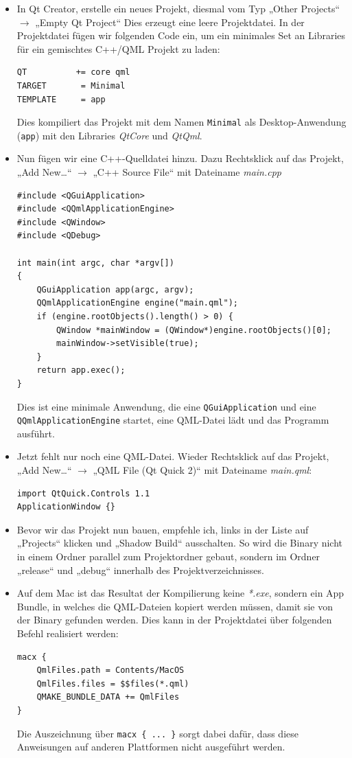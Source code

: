 \documentclass[a4paper]{article}
\begin{document}
\begin{itemize}
\item In Qt Creator, erstelle ein neues Projekt, diesmal vom Typ „Other Projects“ $\rightarrow$ „Empty Qt Project“
Dies erzeugt eine leere Projektdatei. In der Projektdatei fügen wir folgenden Code ein, um ein minimales Set an Libraries für ein gemischtes C++/QML Projekt zu laden:

\begin{verbatim}
QT          += core qml
TARGET       = Minimal
TEMPLATE     = app
\end{verbatim}

Dies kompiliert das Projekt mit dem Namen \verb~Minimal~ als Desktop-Anwendung (\verb~app~) mit den Libraries \emph{QtCore} und \emph{QtQml}.

\item Nun fügen wir eine C++-Quelldatei hinzu. Dazu Rechtsklick auf das Projekt, „Add New\ldots{}“ $\rightarrow$ „C++ Source File“ mit Dateiname \emph{main.cpp}

\begin{verbatim}
#include <QGuiApplication>
#include <QQmlApplicationEngine>
#include <QWindow>
#include <QDebug>

int main(int argc, char *argv[])
{
    QGuiApplication app(argc, argv);
    QQmlApplicationEngine engine("main.qml");
    if (engine.rootObjects().length() > 0) {
        QWindow *mainWindow = (QWindow*)engine.rootObjects()[0];
        mainWindow->setVisible(true);
    }
    return app.exec();
}
\end{verbatim}

Dies ist eine minimale Anwendung, die eine \verb~QGuiApplication~ und eine \verb~QQmlApplicationEngine~ startet, eine QML-Datei lädt und das Programm ausführt.

\item Jetzt fehlt nur noch eine QML-Datei. Wieder Rechtsklick auf das Projekt, „Add New\ldots{}“ $\rightarrow$ „QML File (Qt Quick 2)“ mit Dateiname \emph{main.qml}:

\begin{verbatim}
import QtQuick.Controls 1.1
ApplicationWindow {}
\end{verbatim}

\item Bevor wir das Projekt nun bauen, empfehle ich, links in der Liste auf „Projects“ klicken und „Shadow Build“ ausschalten. So wird die Binary nicht in einem Ordner parallel zum Projektordner gebaut, sondern im Ordner „release“ und „debug“ innerhalb des Projektverzeichnisses.
\item Auf dem Mac ist das Resultat der Kompilierung keine \emph{*.exe}, sondern ein App Bundle, in welches die QML-Dateien kopiert werden müssen, damit sie von der Binary gefunden werden. Dies kann in der Projektdatei über folgenden Befehl realisiert werden:
\begin{verbatim}
macx {
    QmlFiles.path = Contents/MacOS
    QmlFiles.files = $$files(*.qml)
    QMAKE_BUNDLE_DATA += QmlFiles
}
\end{verbatim}
Die Auszeichnung über \verb~macx { ... }~ sorgt dabei dafür, dass diese Anweisungen auf anderen Plattformen nicht ausgeführt werden.
\end{itemize}
\end{document}
